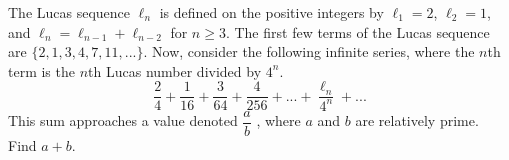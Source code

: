The Lucas sequence $\ell_n$ is defined on the positive integers by $\ell_1 = 2$, $\ell_2 = 1$, and $\ell_n = \ell_{n-1} + \ell_{n-2}$ for $n \ge 3$. The first few terms of the Lucas sequence are $\{2, 1, 3, 4, 7, 11, ...\}$. Now, consider the following infinite series, where the $n$th term is the $n$th Lucas number divided by $4^n$. \[\dfrac{2}{4}+\dfrac{1}{16}+\dfrac{3}{64}+\dfrac{4}{256}+... +\dfrac{\ell_n}{4^n} + ...\]This sum approaches a value denoted $\dfrac{a}{b}$ , where $a$ and $b$ are relatively prime. Find $a + b$.
